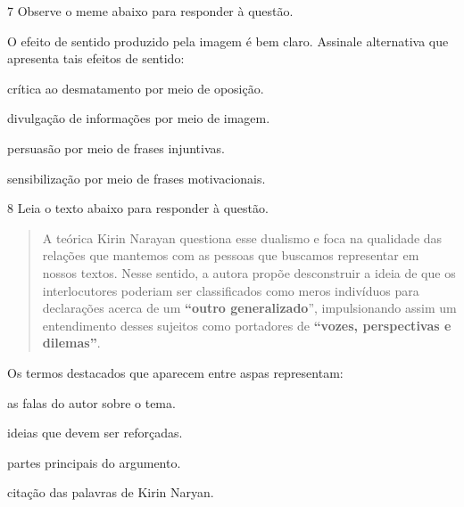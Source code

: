 \num{7} Observe o meme abaixo para responder à questão.


O efeito de sentido produzido pela imagem é bem claro. Assinale
alternativa que apresenta tais efeitos de sentido:

\begin{escolha}

    \item crítica ao desmatamento por meio de oposição.

    \item divulgação de informações por meio de imagem.

    \item persuasão por meio de frases injuntivas. 

    \item sensibilização por meio de frases motivacionais. 

\end{escolha}

\num{8} Leia o texto abaixo para responder à questão. 

\begin{quote}

A teórica Kirin Narayan questiona esse dualismo e foca na qualidade das
relações que mantemos com as pessoas que buscamos representar em nossos
textos. Nesse sentido, a autora propõe desconstruir a ideia de que os
interlocutores poderiam ser classificados como meros indivíduos para
declarações acerca de um \textbf{``outro generalizado}'', impulsionando
assim um entendimento desses sujeitos como portadores de
\textbf{``vozes, perspectivas e dilemas''}.

\end{quote}


Os termos destacados que aparecem entre aspas representam:

\begin{escolha}
    \item as falas do autor sobre o tema.

    \item ideias que devem ser reforçadas.

    \item partes principais do argumento.

    \item citação das palavras de Kirin Naryan.

\end{escolha}

